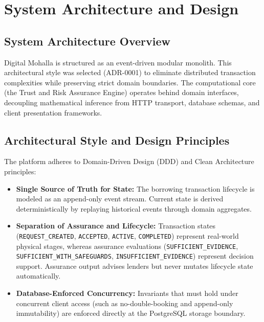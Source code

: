 \chapter{System Architecture and Design}

\section{System Architecture Overview}
Digital Mohalla is structured as an event-driven modular monolith. This architectural style was selected (ADR-0001) to eliminate distributed transaction complexities while preserving strict domain boundaries. The computational core (the Trust and Risk Assurance Engine) operates behind domain interfaces, decoupling mathematical inference from HTTP transport, database schemas, and client presentation frameworks.

\section{Architectural Style and Design Principles}
The platform adheres to Domain-Driven Design (DDD) and Clean Architecture principles:
\begin{itemize}
    \item \textbf{Single Source of Truth for State:} The borrowing transaction lifecycle is modeled as an append-only event stream. Current state is derived deterministically by replaying historical events through domain aggregates.
    \item \textbf{Separation of Assurance and Lifecycle:} Transaction states (\texttt{REQUEST\_CREATED}, \texttt{ACCEPTED}, \texttt{ACTIVE}, \texttt{COMPLETED}) represent real-world physical stages, whereas assurance evaluations (\texttt{SUFFICIENT\_EVIDENCE}, \texttt{SUFFICIENT\_WITH\_SAFEGUARDS}, \texttt{INSUFFICIENT\_EVIDENCE}) represent decision support. Assurance output advises lenders but never mutates lifecycle state automatically.
    \item \textbf{Database-Enforced Concurrency:} Invariants that must hold under concurrent client access (such as no-double-booking and append-only immutability) are enforced directly at the PostgreSQL storage boundary.
\end{itemize}

